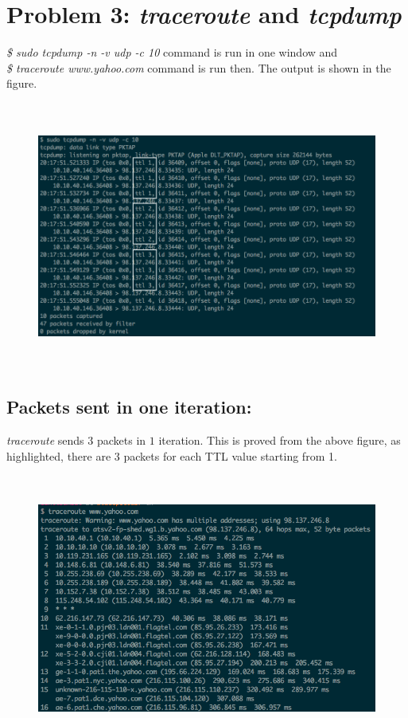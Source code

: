 \documentclass[]{report}
\begin{document}
\section{Problem 3: \textit{traceroute} and \textit{tcpdump}}
\textit{\$ sudo tcpdump -n -v udp -c 10} command is run in one window and 
\\
 \textit{\$ traceroute www.yahoo.com} command is run then. The output is shown in the figure. 

\begin{figure}[H]
	\vspace{0pt}
	\includegraphics[height = 250pt, keepaspectratio]{Snapshots/exe3/q3_1.png}
\end{figure}

\subsection{Packets sent in one iteration:}
\textit{traceroute} sends $3$ packets in $1$ iteration. This is proved from the above figure, as highlighted, there are 3 packets for each TTL value starting from 1.

\begin{figure}[H]
	\vspace{0pt}
	\includegraphics[height = 250pt, keepaspectratio]{Snapshots/exe3/q3_2.png}
\end{figure}
\end{document}
